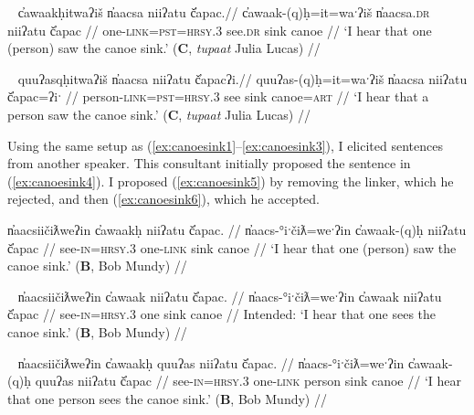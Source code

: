 \ex~ \label{ex:canoesink2}
\begingl
\glpreamble c̓awaakḥitwaʔiš n̓aacsa niiʔatu č̓apac.//
\gla c̓awaak-(q)ḥ=it=waˑʔiš n̓aacsa.\textsc{dr} niiʔatu č̓apac //
\glb one-\textsc{link}=\textsc{pst}=\textsc{hrsy.3} see.\textsc{dr} sink canoe //
\glft `I hear that one (person) saw the canoe sink.' (\textbf{C}, \textit{tupaat} Julia Lucas) //
\endgl
\xe

\ex~ \label{ex:canoesink3}
\begingl
\glpreamble quuʔasqḥitwaʔiš n̓aacsa niiʔatu č̓apacʔi.//
\gla quuʔas-(q)ḥ=it=waˑʔiš n̓aacsa niiʔatu č̓apac=ʔiˑ //
\glb person-\textsc{link}=\textsc{pst}=\textsc{hrsy.3} see sink canoe=\textsc{art} //
\glft `I hear that a person saw the canoe sink.' (\textbf{C}, \textit{tupaat} Julia Lucas) //
\endgl
\xe


Using the same setup as (\ref{ex:canoesink1}--\ref{ex:canoesink3}), I elicited sentences from another speaker. This consultant initially proposed the sentence in (\ref{ex:canoesink4}). I proposed (\ref{ex:canoesink5}) by removing the linker, which he rejected, and then (\ref{ex:canoesink6}), which he accepted.

\ex \label{ex:canoesink4}
\begingl
\glpreamble n̓aacsiičiƛweʔin c̓awaakḥ niiʔatu č̓apac. //
\gla n̓aacs-°iˑčiƛ=weˑʔin c̓awaak-(q)ḥ niiʔatu č̓apac //
\glb see-\textsc{in}=\textsc{hrsy.3} one-\textsc{link} sink canoe //
\glft `I hear that one (person) saw the canoe sink.' (\textbf{B}, Bob Mundy) //
\endgl
\xe

\ex~ \label{ex:canoesink5}
\begingl
\glpreamble *n̓aacsiičiƛweʔin c̓awaak niiʔatu č̓apac. //
\gla n̓aacs-°iˑčiƛ=weˑʔin c̓awaak niiʔatu č̓apac //
\glb see-\textsc{in}=\textsc{hrsy.3} one sink canoe //
\glft Intended: `I hear that one sees the canoe sink.' (\textbf{B}, Bob Mundy) //
\endgl
\xe

\ex~ \label{ex:canoesink6}
\begingl
\glpreamble n̓aacsiičiƛweʔin c̓awaakḥ quuʔas niiʔatu č̓apac. //
\gla n̓aacs-°iˑčiƛ=weˑʔin c̓awaak-(q)ḥ quuʔas niiʔatu č̓apac //
\glb see-\textsc{in}=\textsc{hrsy.3} one-\textsc{link} person sink canoe //
\glft `I hear that one person sees the canoe sink.' (\textbf{B}, Bob Mundy) //
\endgl
\xe

